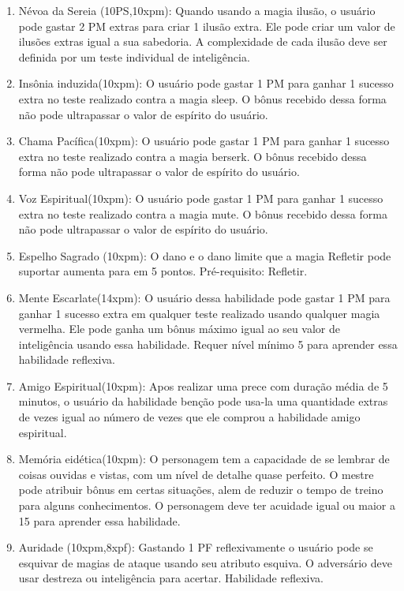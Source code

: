 \begin{enumerate}
		\item Névoa da Sereia (10PS,10xpm): Quando usando a magia ilusão, o usuário pode gastar 2 PM extras para criar 1 ilusão extra. Ele pode criar um valor de ilusões extras igual a sua sabedoria. A complexidade de cada ilusão deve ser definida por um teste individual de inteligência.	
		
	\item Insônia induzida(10xpm): O usuário pode gastar 1 PM para ganhar 1 sucesso extra no teste realizado contra a magia sleep. O bônus recebido dessa forma não pode ultrapassar o valor de espírito do usuário.
	
	\item Chama Pacífica(10xpm): O usuário pode gastar 1 PM para ganhar 1 sucesso extra no teste realizado contra a magia berserk. O bônus recebido dessa forma não pode ultrapassar o valor de espírito do usuário.
		
	\item Voz Espiritual(10xpm): O usuário pode gastar 1 PM para ganhar 1 sucesso extra no teste realizado contra a magia mute. O bônus recebido dessa forma não pode ultrapassar o valor de espírito do usuário.
	
	\item Espelho Sagrado (10xpm): O dano e o dano limite que a magia Refletir pode suportar aumenta para em 5 pontos. Pré-requisito: Refletir.
	
	\item Mente Escarlate(14xpm): O usuário dessa habilidade pode gastar 1 PM para ganhar 1 sucesso extra em qualquer teste realizado usando qualquer magia vermelha. Ele pode ganha um bônus máximo igual ao seu valor de inteligência usando essa habilidade. Requer nível mínimo 5 para aprender essa habilidade reflexiva.

	\item Amigo Espiritual(10xpm): Apos realizar uma prece com duração média de 5 minutos, o usuário da habilidade benção pode usa-la uma quantidade extras de vezes igual ao número de vezes que ele comprou a habilidade amigo espiritual. 

	\item Memória eidética(10xpm): O personagem tem a capacidade de se lembrar de coisas ouvidas e vistas, com um nível de detalhe quase perfeito. O mestre pode atribuir bônus em certas situações, alem de reduzir o tempo de treino para alguns conhecimentos. O personagem deve ter acuidade igual ou maior a 15 para aprender essa habilidade.

		\item Auridade (10xpm,8xpf): Gastando 1 PF reflexivamente o usuário pode se esquivar de magias de ataque usando seu atributo esquiva. O adversário deve usar destreza ou inteligência para acertar. Habilidade reflexiva. 


\end{enumerate}
